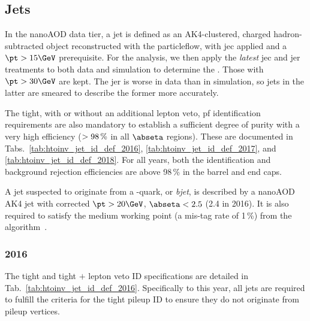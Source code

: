 

\subsection{Jets}
\label{subsec:objects_jets}

In the nanoAOD data tier, a \gls{jet} is defined as an AK4-clustered, charged hadron-subtracted object reconstructed with the \gls{particleflow}, with \acrlong{jec} applied and a $\pt > \text{15}\GeV$ prerequisite. For the analysis, we then apply the \emph{latest} \acrshort{jec} and \acrfull{jer} treatments to both data and simulation to determine the \pt. Those with $\pt > \text{30}\GeV$ are kept. The \acrshort{jer} is worse in data than in simulation, so \glspl{jet} in the latter are smeared to describe the former more accurately.


The tight, with or without an additional lepton veto, \acrshort{pf} identification requirements are also mandatory to establish a sufficient degree of purity with a very high efficiency ($> \text{98\,\%}$ in all $\abseta$ regions). These are documented in Tabs.~\ref{tab:htoinv_jet_id_def_2016}, \ref{tab:htoinv_jet_id_def_2017}, and \ref{tab:htoinv_jet_id_def_2018}. For all years, both the identification and background rejection efficiencies are above 98\,\% in the barrel and end caps.

A \gls{jet} suspected to originate from a \Pbottom-quark, or \emph{\gls{bjet}}, is described by a nanoAOD AK4 \gls{jet} with corrected $\pt > \text{20}\GeV$, $\abseta < \text{2.5}$ (2.4 in 2016). It is also required to satisfy the medium working point (a mis-tag rate of 1\,\%) from the \deepcsv algorithm~\cite{Sirunyan:2017ezt}.




\subsubsection{2016}
\label{subsubsec:objects_jets_2016}

The tight and tight $+$ lepton veto ID specifications are detailed in Tab.~\ref{tab:htoinv_jet_id_def_2016}. Specifically to this year, all \glspl{jet} are required to fulfill the criteria for the tight pileup ID to ensure they do not originate from pileup vertices.

